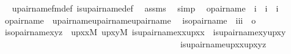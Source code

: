 \begin{isabellebody}
%
\isadelimproof
\ \ %
\endisadelimproof
%
\isatagproof
{}\isamarkupfalse%
\ upair{\isacharunderscore}{\kern0pt}name{\isacharunderscore}{\kern0pt}fm{\isacharunderscore}{\kern0pt}def\ is{\isacharunderscore}{\kern0pt}upair{\isacharunderscore}{\kern0pt}name{\isacharunderscore}{\kern0pt}def\ \isamarkupfalse%
\ assms\ \isamarkupfalse%
\ simp%
\endisatagproof
{\isafoldproof}%
%
\isadelimproof
\isanewline
%
\endisadelimproof
\isanewline
{}\isamarkupfalse%
\isanewline
\ \ opair{\isacharunderscore}{\kern0pt}name\ {\isacharcolon}{\kern0pt}{\isacharcolon}{\kern0pt}\ {\isachardoublequoteopen}i\ {\isasymRightarrow}\ i\ {\isasymRightarrow}\ i{\isachardoublequoteclose}\ \isanewline
\ \ {\isachardoublequoteopen}opair{\isacharunderscore}{\kern0pt}name{\isacharparenleft}{\kern0pt}{\isasymtau}{\isacharcomma}{\kern0pt}{\isasymrho}{\isacharparenright}{\kern0pt}\ {\isasymequiv}\ upair{\isacharunderscore}{\kern0pt}name{\isacharparenleft}{\kern0pt}upair{\isacharunderscore}{\kern0pt}name{\isacharparenleft}{\kern0pt}{\isasymtau}{\isacharcomma}{\kern0pt}{\isasymtau}{\isacharparenright}{\kern0pt}{\isacharcomma}{\kern0pt}upair{\isacharunderscore}{\kern0pt}name{\isacharparenleft}{\kern0pt}{\isasymtau}{\isacharcomma}{\kern0pt}{\isasymrho}{\isacharparenright}{\kern0pt}{\isacharparenright}{\kern0pt}{\isachardoublequoteclose}\isanewline
\isanewline
{}\isamarkupfalse%
\isanewline
\ \ is{\isacharunderscore}{\kern0pt}opair{\isacharunderscore}{\kern0pt}name\ {\isacharcolon}{\kern0pt}{\isacharcolon}{\kern0pt}\ {\isachardoublequoteopen}{\isacharbrackleft}{\kern0pt}i{\isacharcomma}{\kern0pt}i{\isacharcomma}{\kern0pt}i{\isacharbrackright}{\kern0pt}\ {\isasymRightarrow}\ o{\isachardoublequoteclose}\ \isanewline
\ \ {\isachardoublequoteopen}is{\isacharunderscore}{\kern0pt}opair{\isacharunderscore}{\kern0pt}name{\isacharparenleft}{\kern0pt}x{\isacharcomma}{\kern0pt}y{\isacharcomma}{\kern0pt}z{\isacharparenright}{\kern0pt}\ {\isasymequiv}\ {\isasymexists}upxx{\isasymin}M{\isachardot}{\kern0pt}\ {\isasymexists}upxy{\isasymin}M{\isachardot}{\kern0pt}\ is{\isacharunderscore}{\kern0pt}upair{\isacharunderscore}{\kern0pt}name{\isacharparenleft}{\kern0pt}x{\isacharcomma}{\kern0pt}x{\isacharcomma}{\kern0pt}upxx{\isacharparenright}{\kern0pt}\ {\isasymand}\ is{\isacharunderscore}{\kern0pt}upair{\isacharunderscore}{\kern0pt}name{\isacharparenleft}{\kern0pt}x{\isacharcomma}{\kern0pt}y{\isacharcomma}{\kern0pt}upxy{\isacharparenright}{\kern0pt}\isanewline
\ \ \ \ \ \ \ \ \ \ \ \ \ \ \ \ \ \ \ \ \ \ \ \ \ \ \ \ \ \ \ \ \ \ \ \ \ \ \ \ \ \ {\isasymand}\ is{\isacharunderscore}{\kern0pt}upair{\isacharunderscore}{\kern0pt}name{\isacharparenleft}{\kern0pt}upxx{\isacharcomma}{\kern0pt}upxy{\isacharcomma}{\kern0pt}z{\isacharparenright}{\kern0pt}{\isachardoublequoteclose}\ \isanewline

\end{isabellebody}
